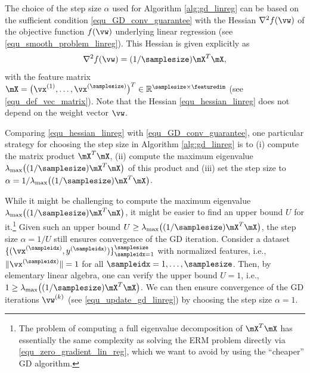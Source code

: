 \documentclass[12pt]{report}
\begin{document}
The choice of the step size $\alpha$ used for Algorithm \ref{alg:gd_linreg} can be based on the sufficient condition \eqref{equ_GD_conv_guarantee} 
with the Hessian $\nabla^{2} f(\vw)$ of the objective function $f(\vw)$ underlying linear regression (see \eqref{equ_smooth_problem_linreg}). This 
Hessian is given explicitly as  
\begin{equation}
\label{equ_hessian_linreg}
\nabla^{2} f(\vw) = (1/\samplesize) \mX^{T} \mX, 
\end{equation}
with the feature matrix $\mX=\big(\vx^{(1)},\ldots,\vx^{(\samplesize)}\big)^{T} \in \mathbb{R}^{\samplesize \times \featuredim}$ (see \eqref{equ_def_vec_matrix}). 
Note that the Hessian \eqref{equ_hessian_linreg} does not depend on the weight vector $\vw$. 


Comparing \eqref{equ_hessian_linreg} with \eqref{equ_GD_conv_guarantee}, one particular strategy for choosing 
the step size in Algorithm \ref{alg:gd_linreg} is to (i) compute the matrix product $ \mX^{T} \mX$, (ii) compute the 
maximum eigenvalue $\lambda_{\rm max} \big(  (1/\samplesize)  \mX^{T} \mX \big)$ of this product and (iii) set 
the step size to $\alpha =1/\lambda_{\rm max} \big(  (1/\samplesize)  \mX^{T} \mX \big)$. 

While it might be challenging to compute the maximum eigenvalue $\lambda_{\rm max} \big(  (1/\samplesize)  \mX^{T} \mX \big)$, 
it might be easier to find an upper bound $U$ for it.\footnote{The problem of 
computing a full eigenvalue decomposition of $\mX^{T} \mX$ has essentially the same complexity as solving the 
ERM problem directly via \eqref{equ_zero_gradient_lin_reg}, which we want to avoid by using the ``cheaper'' GD algorithm.}
Given such an upper bound $U \geq \lambda_{\rm max} \big( (1/\samplesize)  \mX^{T} \mX \big)$, the step 
size $\alpha =1/U$ still ensures convergence of the GD iteration. Consider a dataset $\{(\vx^{(\sampleidx)},y^{(\sampleidx)})\}_{\sampleidx=1}^{\samplesize}$ 
with normalized features, i.e., $\| \vx^{(\sampleidx)}\| = 1$ for all $\sampleidx =1,\ldots,\samplesize$. Then, 
by elementary linear algebra, one can verify the upper bound $U= 1$, i.e., $ 1 \geq  \lambda_{\rm max} \big(  (1/\samplesize)  \mX^{T} \mX \big)$. 
We can then ensure convergence of the GD iterations $\vw^{(k)}$ (see \eqref{equ_update_gd_linreg}) by 
choosing the step size $\alpha =1$.

\end{document}
